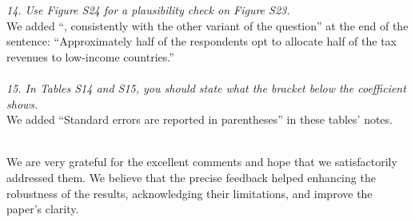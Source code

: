 \documentclass[12pt,english]{article}
\begin{document}
\textit{14. Use Figure S24 for a plausibility check on Figure S23.}~\\

We added ``, consistently with the other variant of the question'' at the end of the sentence: ``Approximately half of the respondents opt to allocate half of the tax revenues to low-income countries.''
~\\ ~\\

\textit{15. In Tables S14 and S15, you should state what the bracket below the coefficient shows.}~\\

We added ``Standard errors are reported in parentheses'' in these tables' notes.

~\\

We are very grateful for the excellent comments and hope that we satisfactorily addressed them. We believe that the precise feedback helped enhancing the robustness of the results, acknowledging their limitations, and improve the paper's clarity.

\clearpage
\renewcommand{\url}[1]{\href{#1}{Link}} 

\end{document}
